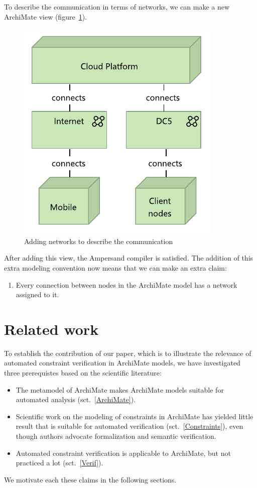 \documentclass[sn-vancouver]{sn-jnl}%
\begin{document}
To describe the communication in terms of networks, we can make a new ArchiMate view (figure~\ref{fig: Network connections}).
\begin{figure}[b]
   \centering
   \includegraphics[clip=true, scale=0.9]{Network connections.pdf}
   \caption{Adding networks to describe the communication}
   \label{fig: Network connections}
\end{figure}
After adding this view, the Ampersand compiler is satisfied.
The addition of this extra modeling convention now means that we can make an extra claim:
\begin{enumerate}
    \item Every connection between nodes in the ArchiMate model has a network assigned to it.
\end{enumerate}

\section{Related work}\label{Related work}
To establish the contribution of our paper, which is to illustrate the relevance of automated constraint verification in ArchiMate models,
we have investigated three prerequistes based on the scientific literature:
\begin{itemize}
   \item The metamodel of ArchiMate makes ArchiMate models suitable for automated analysis (sct.~\ref{ArchiMate}).
   \item Scientific work on the modeling of constraints in ArchiMate has yielded little result that is suitable for automated verification (sct.~\ref{Constraints}),
   even though authors advocate formalization and semantic verification.
   \item Automated constraint verification is applicable to ArchiMate, but not practiced a lot (sct.~\ref{Verif}).
\end{itemize}
We motivate each these claims in the following sections.
\end{document}

